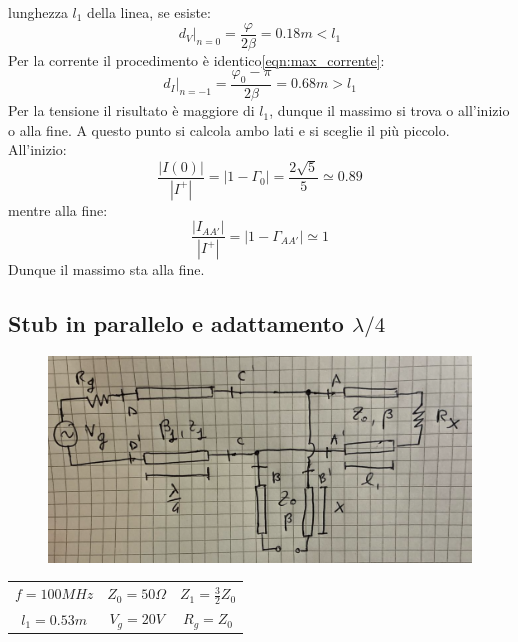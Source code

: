 \documentclass{book}
\begin{document}
        lunghezza $l_{1}$ della linea, se esiste:
        \begin{equation}
            d_{V}|_{n=0}=\frac{\varphi}{2 \beta} = 0.18m < l_{1}
        \end{equation} 
        Per la corrente il procedimento è identico\ref{eqn:max_corrente}:
        \begin{equation}
            d_{I}|_{n=-1}=\frac{\varphi_{0}-\pi}{2 \beta} = 0.68m>l_{1}
        \end{equation}
        Per la tensione il risultato è maggiore di $l_{1}$, dunque il massimo si trova o all'inizio o alla fine. A questo punto 
        si calcola ambo lati e si sceglie il più piccolo. All'inizio:
        \begin{equation}
            \frac{|I(0)|}{|I^{+}|}=|1-\Gamma_{0}|=\frac{2\sqrt{5}}{5} \simeq 0.89
        \end{equation}
        mentre alla fine:
        \begin{equation}
            \frac{|I_{AA'}|}{|I^{+}|}=|1-\Gamma_{AA'}| \simeq 1
        \end{equation}
        Dunque il massimo sta alla fine.
        \newpage
    \subsection{Stub in parallelo e adattamento $\lambda /4$}
        \begin{figure}[h!]
            \center  
            \includegraphics[width=0.7\linewidth]{img/Esercizi/Esercizi4.png}
        \end{figure}
        \begin{center}
            \begin{tabular}{c c c}
                $f = 100MHz$ & $Z_{0}=50 \Omega$ & $Z_{1}=\frac{3}{2}Z_{0}$ \\
                $l_{1}=0.53m$ & $V_{g}=20V$ & $R_{g}=Z_{0}$
            \end{tabular}
        \end{center}
        
\end{document}
